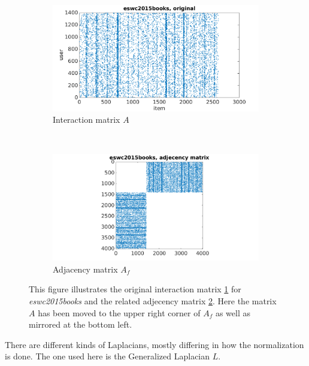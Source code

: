 \begin{figure}[h!]
    \begin{subfigure}[h!]{0.5\textwidth}
        \includegraphics[width=\textwidth]{fig/spectral_data/eswc2015books_original.png}
        \caption{Interaction matrix $A$}
        \label{fig:spec:book:orig}
    \end{subfigure}
    ~
    \begin{subfigure}[h!]{0.5\textwidth}
        \includegraphics[width=\textwidth]{fig/spectral_data/eswc2015books_adj.png}
        \caption{Adjacency matrix $A_f$}
        \label{fig:spec:book:adj}
    \end{subfigure}
    \caption{This figure illustrates the original interaction matrix \ref{fig:spec:book:orig} for \textit{eswc2015books} and the related adjecency matrix \ref{fig:spec:book:adj}. Here the matrix $A$ has been moved to the upper right corner of $A_f$ as well as mirrored at the bottom left.}
    \label{fig:spec:book:matrix}
\end{figure}

There are different kinds of Laplacians, mostly differing in how the normalization is done. The one used here is the Generalized Laplacian $L$.

